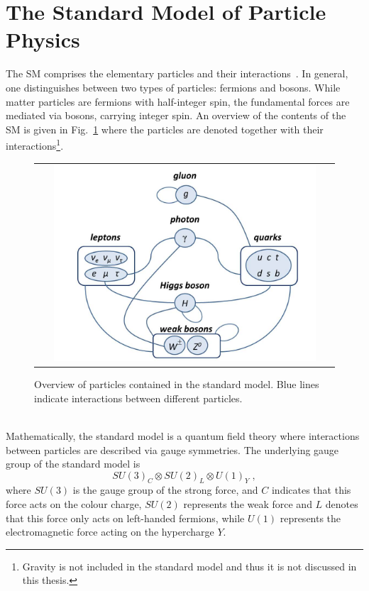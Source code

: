 \section{The Standard Model of Particle Physics}
\label{sec:sm}
The SM comprises the elementary particles and their interactions~\cite{bib:PDG:2012}. In general, one distinguishes between two types of particles: fermions and bosons. While matter particles are fermions with half-integer spin, the fundamental forces are mediated via bosons, carrying integer spin. An overview of the contents of the SM is given in Fig.~\ref{fig:SM} where the particles are denoted together with their interactions\footnote{Gravity is not included in the standard model and thus it is not discussed in this thesis.}. 
\begin{figure}[!tp]
  \centering 
  \begin{tabular}{c}
    \includegraphics[width=0.9\textwidth]{figures/SM.jpg}
  \end{tabular}
  \caption{Overview of particles contained in the standard model. Blue lines indicate interactions between different particles.}
  \label{fig:SM}
\end{figure}
\\
Mathematically, the standard model is a quantum field theory where interactions between particles are described via gauge symmetries. The underlying gauge group of the standard model is 
\begin{equation*}
SU(3)_{C} \otimes SU(2)_{L} \otimes U(1)_{Y} \; ,
\end{equation*}
where $SU(3)$ is the gauge group of the strong force, and $C$ indicates that this force acts on the colour charge, $SU(2)$ represents the weak force and $L$ denotes that this force only acts on left-handed fermions, while $U(1)$ represents the electromagnetic force acting on the hypercharge $Y$.\\
